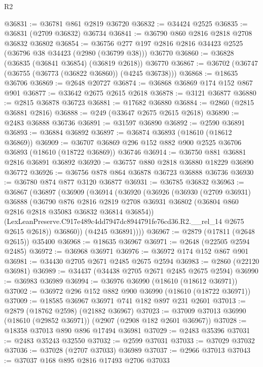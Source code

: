 \begin{lexlean}{R2}
\begin{coremodule}
@36831 := @36781 @861 @2819 @36720
@36832 := @34424 @2525
@36835 := @36831 (@2709 @36832) @36734
@36841 := @36790 @860 @2816 @2818 @2708 @36832 @36802
@36854 := @36756 @277 @197 @2816 @2816 @34423 @2525 (@36796 @38 @34423 (@2980 (@36799 @38))) @36770
@36860 := @36828 (@36835 (@36841 @36854) (@36819 @2618)) @36770
@36867 := @36702 (@36747 (@36755 (@36773 (@36822 @36860)) (@4245 @36738)))
@36868 := @18635 @36706
@36869 := @2648 @20727
@36874 := @36868 @36869 @174 @152 @867 @901
@36877 := @33642 @2675 @2615 @2618
@36878 := @3121 @36877
@36880 := @2815 @36878 @36723
@36881 := @17682 @36880
@36884 := @2860 (@2815 @36881 @2816)
@36888 := @249 (@33647 @2675 @2615 @2618)
@36890 := @2483 @36888 @36736
@36891 := @31597 @36890
@36892 := @2590 @36891
@36893 := @36884 @36892
@36897 := @36874 @36893 (@18610 (@18612 @36869))
@36909 := @36707 @36869 @296 @152 @882 @900 @2525 @36706 @36893 (@18610 (@18722 @36869)) @36746
@36914 := @36750 @881 @36881 @2816 @36891 @36892
@36920 := @36757 @880 @2818 @36880 @18229 @36890 @36772
@36926 := @36756 @878 @864 @36878 @36723 @36888 @36736
@36930 := @36780 @874 @877 @3120 @36877
@36931 := @36785 @36832
@36963 := @36867
    (@36897
      (@36909
        (@36914
          (@36920
            (@36926
              (@36930
                (@2709 @36931)
                @36888
                (@36790
                  @876
                  @2816
                  @2819
                  @2708
                  @36931
                  @36802
                  (@36804 @860 @2816 @2818 @35083 @36832 @36814 @36854))
                (LexLeanPreserve.C917e489c4dd7947dc8944791fe76cd36.R2.__rel_14 @2675 @2615 @2618))
              @36860))
          (@4245 @36891))))
@36967 := @2879 (@17811 (@2648 @2615)) @35400
@36968 := @18635 @36967
@36971 := @2648 (@22505 @2594 @2485)
@36972 := @36968 @36971
@36976 := @36972 @174 @152 @867 @901
@36981 := @34430 @2705 @2671 @2485 @2675 @2594
@36983 := @2860 (@22120 @36981)
@36989 := @34437 (@34438 @2705 @2671 @2485 @2675 @2594)
@36990 := @36983 @36989
@36994 := @36976 @36990 (@18610 (@18612 @36971))
@37002 := @36972 @296 @152 @882 @900 @36990 (@18610 (@18722 @36971))
@37009 := @18585 @36967 @36971 @741 @182 @897 @231 @2601
@37013 := @2879 (@18762 @2598) (@21882 @36967)
@37023 := @37009 @37013 @36990 (@18610 (@29852 @36971)) (@2907 (@2908 @182 @2601 @36967))
@37028 := @18358 @37013 @890 @896 @17494 @36981
@37029 := @2483 @35396
@37031 := @2483 @35243 @32550
@37032 := @2599 @37031
@37033 := @37029 @37032
@37036 := @37028 (@2707 @37033) @36989
@37037 := @2966 @37013
@37043 := @37037 @168 @895 @2816 @17493 @2706 @37033

\end{coremodule}
\end{lexlean}
